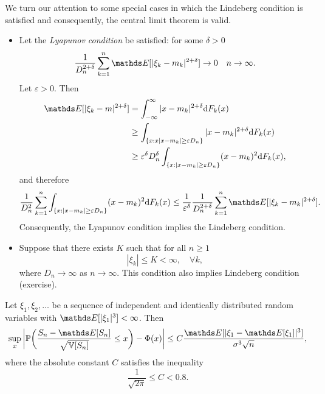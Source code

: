 We turn our attention to some special cases in which the Lindeberg condition is satisfied and consequently, the central limit theorem is valid.
\begin{itemize}
    \item Let the \textit{Lyapunov condition} be satisfied: for some $\delta > 0$
    \begin{equation*}
        \frac{1}{D_n^{2 +\delta}} \sum_{k=1}^n \E[|\xi_k - m_k|^{2+\delta}] \to 0 \quad n \to \infty.
    \end{equation*}
    Let $\varepsilon > 0$. Then
    \begin{align*}
        \E[|\xi_k - m|^{2+\delta}] &= \int_{-\infty}^\infty |x - m_k|^{2+\delta} \d F_k(x)\\
        &\ge \int_{\{x: x|x-m_k| \ge \varepsilon D_n\}} |x - m_k|^{2+\delta}  \d F_k(x)\\
        &\ge \varepsilon^\delta D_n^\delta \int_{\{x: |x-m_k| \ge \varepsilon D_n\}} (x - m_k)^{2}  \d F_k(x),
    \end{align*}
    and therefore 
    \begin{equation*}
        \frac{1}{D_n^2}\sum_{k=1}^n \int_{\{x: |x-m_k| \ge \varepsilon D_n\}} (x - m_k)^{2}  \d F_k(x) \le \frac{1}{\varepsilon^\delta} \frac{1}{D_n^{2 + \delta}} \sum_{k=1}^n \E[|\xi_k - m_k|^{2 + \delta}].
    \end{equation*}
    Consequently, the Lyapunov condition implies the Lindeberg condition.
    \item Suppose that there exists $K$ such that for all $n \ge 1$
    \begin{equation*}
        |\xi_k| \le K < \infty, \quad \forall k,
    \end{equation*}
    where $D_n \to \infty$ as $n \to \infty$. This condition also implies Lindeberg condition (exercise).
\end{itemize}
\begin{theorem}
Let $\xi_1, \xi_2, \dots$ be a sequence of independent and identically distributed random variables with $\E[|\xi_1|^3] < \infty$. Then
\begin{equation*}
    \sup_x \bigg| \p\bigg( \frac{S_n - \E[S_n]}{\sqrt{\V[S_n]}} \le x\bigg) - \Phi(x) \bigg| \le C\frac{\E[|\xi_1 - \E[\xi_1]|^3]}{\sigma^3\sqrt{n}},
\end{equation*}
where the absolute constant $C$ satisfies the inequality
\begin{equation*}
    \frac{1}{\sqrt{2\pi}} \le C < 0.8.
\end{equation*}
\end{theorem}
